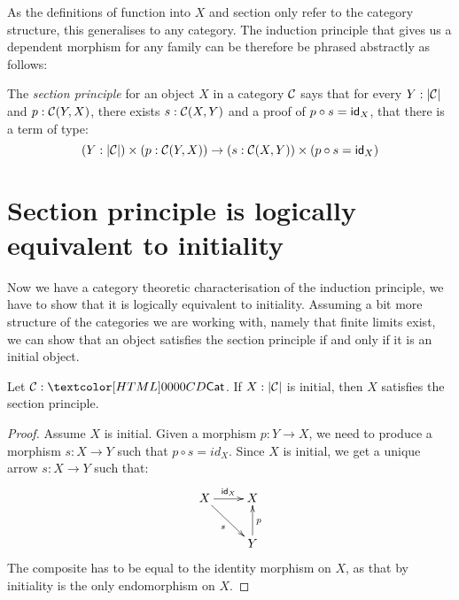 As the definitions of function into $X$ and section only refer to the
category structure, this generalises to any category. The induction
principle that gives us a dependent morphism for any family can be
therefore be phrased abstractly as follows:

\begin{definition}
  The \emph{section principle} for an object $X$ in a category $\mathcal{C}$
  says that for every $Y : | \mathcal{C} |$ and $p : \mathcal{C}(Y,X)$, there exists
  $s : \mathcal{C}(X,Y)$ and a proof of $p \circ s = \id_X$, \ie that there is
  a term of type:
  \[
    (Y : | \Cc |) \times (p : \Cc(Y,X)) \to (s : \Cc(X,Y)) \times (p \circ s = \id_X)
  \]
\end{definition}

\section{Section principle is logically equivalent to initiality}

Now we have a category theoretic characterisation of the induction
principle, we have to show that it is logically equivalent to
initiality. Assuming a bit more structure of the categories we are
working with, namely that finite limits exist, we can show that an
object satisfies the section principle if and only if it is an initial
object.

\begin{lemma}
  \label{initiality-to-section}
  Let $\Cc: \Cat$. If $X : | \mathcal{C} |$ is initial, then $X$ satisfies the
  section principle.
\end{lemma}
\begin{proof}
  Assume $X$ is initial. Given a morphism $p : Y \to X$, we need to
  produce a morphism $s : X \to Y$ such that $p \circ s = id_X$.
  Since $X$ is initial, we get a unique arrow $s : X \to Y$ such that:
  $$
  \xymatrix{
    X \ar[r]^{\id_{X}} \ar[rd]_{s} &X \\
    &Y \ar[u]_{p}
  }
  $$
  The composite has to be equal to the identity morphism on $X$, as
  that by initiality is the only endomorphism on $X$.
\end{proof}

